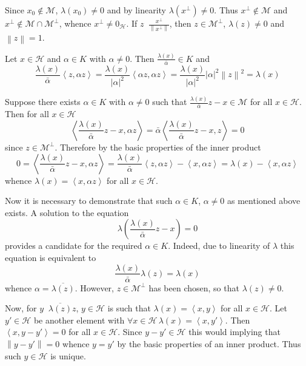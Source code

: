 \documentclass[a4paper]{article}
\newcommand{\brac}[1]{\left ( #1 \right )}
\newcommand{\abs}[1]{\left | #1 \right |}
\newcommand{\nrm}[1]{\left\| #1 \right \|}
\newcommand{\brkt}[1]{\left\langle #1 \right\rangle}
\newcommand{\Hcal}{\mathcal{H}}
\newcommand{\Mcal}{\mathcal{M}}
\newcommand{\defn}{\mathop{\overset{\Delta}{=}}\nolimits}
\begin{document}
Since $x_0\notin\Mcal$, $\lambda\brac{x_0}\neq0$ and by linearity $\lambda\brac{x^\perp}\neq 0$. Thus $x^\perp\notin \Mcal$ and $x^\perp\notin \Mcal\cap \Mcal^\perp$, whence $x^\perp \neq 0_\Hcal$. If $z\defn \frac{x^\perp}{\nrm{x^\perp}}$, then $z\in \Mcal^\perp$, $\lambda\brac{z}\neq 0$ and $\nrm{z}=1$.

Let $x\in \Hcal$ and $\alpha\in K$ with $\alpha\neq 0$. Then $\frac{\lambda\brac{x}}{\bar{\alpha}}\in K$ and \[\frac{\lambda\brac{x}}{\bar{\alpha}} \brkt{z,\alpha z} = \frac{\lambda\brac{x}}{\abs{\alpha}^2}\brkt{\alpha z, \alpha z} = \frac{\lambda\brac{x}}{\abs{\alpha}^2} \abs{\alpha}^2\nrm{z}^2 = \lambda\brac{x}\]

Suppose there exists $\alpha\in K$ with $\alpha\neq 0$ such that $\frac{\lambda\brac{x}}{\bar{\alpha}} z - x \in \Mcal$ for all $x\in \Hcal$. Then for all $x\in\Hcal$ \[\brkt{\frac{\lambda\brac{x}}{\bar{\alpha}} z - x, \alpha z} = \bar{\alpha} \brkt{\frac{\lambda\brac{x}}{\bar{\alpha}} z - x, z} = 0\] since $z\in \Mcal^\perp$. Therefore by the basic properties of the inner product \[0 = \brkt{\frac{\lambda\brac{x}}{\bar{\alpha}} z - x, \alpha z} = \frac{\lambda\brac{x}}{\bar{\alpha}} \brkt{z, \alpha z}-\brkt{x, \alpha z} = \lambda\brac{x}-\brkt{x, \alpha z} \] whence $\lambda\brac{x} = \brkt{x, \alpha z}$ for all $x\in \Hcal$.

Now it is necessary to demonstrate that such $\alpha\in K$, $\alpha\neq 0$ as mentioned above exists. A solution to the equation \[\lambda\brac{ \frac{\lambda\brac{x}}{\bar{\alpha}} z - x } = 0\] provides a candidate for the required $\alpha\in K$. Indeed, due to linearity of $\lambda$ this equation is equivalent to \[\frac{\lambda\brac{x}}{\bar{\alpha}} \lambda\brac{z}=\lambda\brac{x}\] whence $\alpha = \overline{\lambda\brac{z}}$. However, $z\in \Mcal^\perp$ has been chosen, so that $\lambda\brac{z}\neq 0$.

Now, for $y\defn \overline{\lambda\brac{z}} z$, $y\in \Hcal$ is such that $\lambda\brac{x}=\brkt{x,y}$ for all $x\in \Hcal$. Let $y'\in \Hcal$ be another element with $\forall x\in \Hcal\, \lambda\brac{x}=\brkt{x,y'}$. Then $\brkt{x,y-y'}=0$ for all $x\in \Hcal$. Since $y-y'\in \Hcal$ this would implying that $\nrm{y-y'}=0$ whence $y=y'$ by the basic properties of an inner product. Thus such $y\in \Hcal$ is unique.\\
\end{document}
